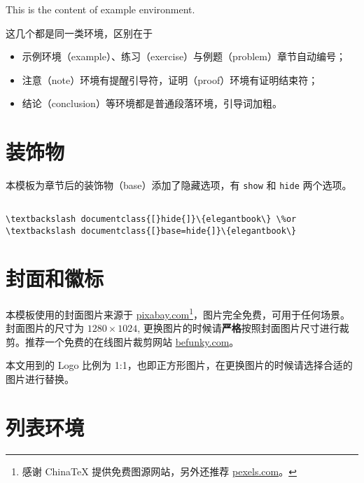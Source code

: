 \documentclass[cn,11pt,fancy,hide]{elegantbook}
\providecommand{\tightlist}{%
  \setlength{\itemsep}{0pt}\setlength{\parskip}{0pt}}
\let\rmarkdownfootnote\footnote%
\def\footnote{\protect\rmarkdownfootnote}
\begin{document}
\begin{shaded}

This is the content of example environment.

\end{shaded}

这几个都是同一类环境，区别在于

\begin{itemize}
\tightlist
\item
  示例环境（example）、练习（exercise）与例题（problem）章节自动编号；
\item
  注意（note）环境有提醒引导符，证明（proof）环境有证明结束符；
\item
  结论（conclusion）等环境都是普通段落环境，引导词加粗。
\end{itemize}

\hypertarget{section-7}{%
\section{装饰物}\label{section-7}}

本模板为章节后的装饰物（base）添加了隐藏选项，有 \texttt{show} 和 \texttt{hide} 两个选项。

\begin{lstlisting}

\textbackslash documentclass{[}hide{]}\{elegantbook\} \%or
\textbackslash documentclass{[}base=hide{]}\{elegantbook\}

\end{lstlisting}

\hypertarget{section-8}{%
\section{封面和徽标}\label{section-8}}

本模板使用的封面图片来源于 \href{https://pixabay.com/en/tea-time-poetry-coffee-reading-3240766/}{pixabay.com}\footnote{感谢 ChinaTeX 提供免费图源网站，另外还推荐 \href{https://www.pexels.com/}{pexels.com}。}，图片完全免费，可用于任何场景。封面图片的尺寸为 \(1280 \times 1024\), 更换图片的时候请\textbf{严格}按照封面图片尺寸进行裁剪。推荐一个免费的在线图片裁剪网站 \href{https://www.befunky.com/create/crop-photo/}{befunky.com}。

本文用到的 Logo 比例为 1:1，也即正方形图片，在更换图片的时候请选择合适的图片进行替换。

\hypertarget{section-9}{%
\section{列表环境}\label{section-9}}
\end{document}
